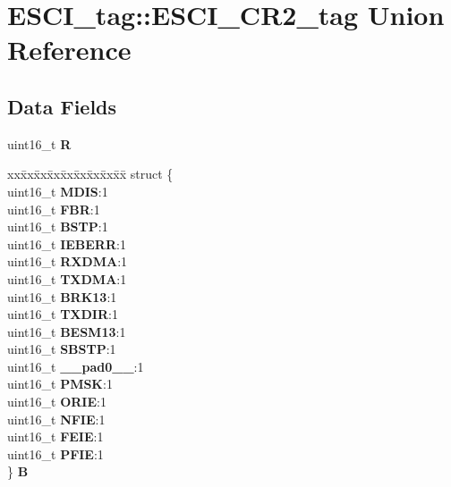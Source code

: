 \hypertarget{unionESCI__tag_1_1ESCI__CR2__tag}{}\section{E\+S\+C\+I\+\_\+tag\+::E\+S\+C\+I\+\_\+\+C\+R2\+\_\+tag Union Reference}
\label{unionESCI__tag_1_1ESCI__CR2__tag}
\subsection*{Data Fields}
\begin{DoxyCompactItemize}
\item 
\mbox{\label{unionESCI__tag_1_1ESCI__CR2__tag_aba193fa0466efd02c10678a83c815f84}} 
uint16\+\_\+t {\bfseries R}
\item 
\mbox{\label{unionESCI__tag_1_1ESCI__CR2__tag_a3545d557ae6939d98427c1893515f575}} 
\begin{tabbing}
xx\=xx\=xx\=xx\=xx\=xx\=xx\=xx\=xx\=\kill
struct \{\\
\>uint16\_t {\bfseries MDIS}:1\\
\>uint16\_t {\bfseries FBR}:1\\
\>uint16\_t {\bfseries BSTP}:1\\
\>uint16\_t {\bfseries IEBERR}:1\\
\>uint16\_t {\bfseries RXDMA}:1\\
\>uint16\_t {\bfseries TXDMA}:1\\
\>uint16\_t {\bfseries BRK13}:1\\
\>uint16\_t {\bfseries TXDIR}:1\\
\>uint16\_t {\bfseries BESM13}:1\\
\>uint16\_t {\bfseries SBSTP}:1\\
\>uint16\_t {\bfseries \_\_pad0\_\_}:1\\
\>uint16\_t {\bfseries PMSK}:1\\
\>uint16\_t {\bfseries ORIE}:1\\
\>uint16\_t {\bfseries NFIE}:1\\
\>uint16\_t {\bfseries FEIE}:1\\
\>uint16\_t {\bfseries PFIE}:1\\
\} {\bfseries B}\\


\end{tabbing}
\end{DoxyCompactItemize}

